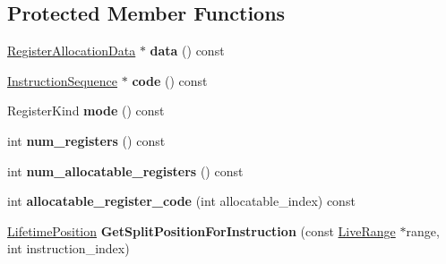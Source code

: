 \subsection*{Protected Member Functions}
\begin{DoxyCompactItemize}
\item 
\hyperlink{classv8_1_1internal_1_1compiler_1_1_register_allocation_data}{Register\+Allocation\+Data} $\ast$ {\bfseries data} () const \hypertarget{classv8_1_1internal_1_1compiler_1_1_register_allocator_a6fd3a5f68edd534cec205814b1586355}{}\label{classv8_1_1internal_1_1compiler_1_1_register_allocator_a6fd3a5f68edd534cec205814b1586355}

\item 
\hyperlink{classv8_1_1internal_1_1compiler_1_1_instruction_sequence}{Instruction\+Sequence} $\ast$ {\bfseries code} () const \hypertarget{classv8_1_1internal_1_1compiler_1_1_register_allocator_aa7dfec681835f6287e865acd6f5d0344}{}\label{classv8_1_1internal_1_1compiler_1_1_register_allocator_aa7dfec681835f6287e865acd6f5d0344}

\item 
Register\+Kind {\bfseries mode} () const \hypertarget{classv8_1_1internal_1_1compiler_1_1_register_allocator_ab967fc5720933a4637b33ceef8808f4d}{}\label{classv8_1_1internal_1_1compiler_1_1_register_allocator_ab967fc5720933a4637b33ceef8808f4d}

\item 
int {\bfseries num\+\_\+registers} () const \hypertarget{classv8_1_1internal_1_1compiler_1_1_register_allocator_abf5db7d1d2b10635133d9766e15c905d}{}\label{classv8_1_1internal_1_1compiler_1_1_register_allocator_abf5db7d1d2b10635133d9766e15c905d}

\item 
int {\bfseries num\+\_\+allocatable\+\_\+registers} () const \hypertarget{classv8_1_1internal_1_1compiler_1_1_register_allocator_a1e89f744fb0ced8d26a8e01d781b8ab7}{}\label{classv8_1_1internal_1_1compiler_1_1_register_allocator_a1e89f744fb0ced8d26a8e01d781b8ab7}

\item 
int {\bfseries allocatable\+\_\+register\+\_\+code} (int allocatable\+\_\+index) const \hypertarget{classv8_1_1internal_1_1compiler_1_1_register_allocator_a71c45f6e138724db8f38db51713de2f5}{}\label{classv8_1_1internal_1_1compiler_1_1_register_allocator_a71c45f6e138724db8f38db51713de2f5}

\item 
\hyperlink{classv8_1_1internal_1_1compiler_1_1_lifetime_position}{Lifetime\+Position} {\bfseries Get\+Split\+Position\+For\+Instruction} (const \hyperlink{classv8_1_1internal_1_1compiler_1_1_live_range}{Live\+Range} $\ast$range, int instruction\+\_\+index)\hypertarget{classv8_1_1internal_1_1compiler_1_1_register_allocator_a63a56714278d376405b0c84c597df7f7}{}\label{classv8_1_1internal_1_1compiler_1_1_register_allocator_a63a56714278d376405b0c84c597df7f7}


\end{DoxyCompactItemize}
